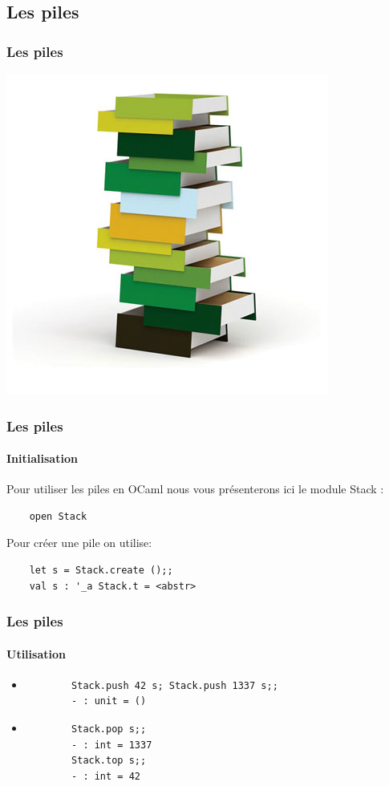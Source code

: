 \subsection{Les piles}
\begin{frame}
	\frametitle{Les piles}
	\includegraphics[scale=0.4]{pics/stack.jpg}
\end{frame}

\begin{frame}[fragile]
	\frametitle{Les piles}
	\framesubtitle{Initialisation}
	Pour utiliser les piles en OCaml nous vous présenterons ici le module Stack :
	\begin{lstlisting}
	open Stack
	\end{lstlisting}
	Pour créer une pile on utilise:
	\begin{lstlisting}
	let s = Stack.create ();;
	val s : '_a Stack.t = <abstr>
	\end{lstlisting}
\end{frame}

\begin{frame}[fragile]
\frametitle{Les piles}
\framesubtitle{Utilisation}
	\begin{itemize}
	
	\item
		\begin{lstlisting}
		Stack.push 42 s; Stack.push 1337 s;;
		- : unit = ()	
		\end{lstlisting}	
	
	\item
		\begin{lstlisting}
		Stack.pop s;;
		- : int = 1337
		Stack.top s;;
		- : int = 42
		\end{lstlisting}	

	\end{itemize}

\end{frame}

